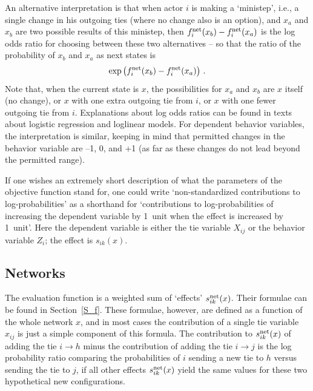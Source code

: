 \documentclass[a4paper,fleqn,11pt]{article}
\newcommand{\+}{\, + \,}
\begin{document}
An alternative interpretation is that when actor $i$ is making
a `ministep', i.e., a single change in his outgoing ties
(where no change also is an option), and
$x_a$ and $x_b$ are two possible results of this ministep,
then $f^{\rm net}_i(x_b) - f^{\rm net}_i(x_a)$ is the log odds ratio
for choosing between these two alternatives -- so that the ratio
of the probability of $x_b$ and $x_a$ as next states is
\[
  \exp\big(f^{\rm net}_i(x_b) - f^{\rm net}_i(x_a)\big) \ .
\]
Note that, when the current state is $x$, the possibilities
for $x_a$ and $x_b$ are $x$ itself (no change), or $x$ with one extra
outgoing tie from $i$, or $x$ with one fewer outgoing tie from $i$.
Explanations about log odds ratios can be found
in texts about logistic regression and loglinear models.
For dependent behavior variables, the interpretation is similar,
keeping in mind that permitted changes in the behavior variable are
--1, 0, and +1 (as far as these changes do not lead beyond the
permitted range).

If one wishes an extremely short description of what the parameters
of the objective function stand for, one could write
`non-standardized contributions to log-probabilities'
as a shorthand for
`contributions to log-probabilities of increasing the
dependent variable by 1~unit when the effect is increased by 1~unit'.
Here the dependent variable is either the tie variable $X_{ij}$
or the behavior variable $Z_i$; the effect is $s_{ik}(x)$.



\subsection{Networks}

The evaluation function is a weighted sum of `effects'
$s^{\rm net}_{ik}(x)$.
Their formulae can be found in Section~\ref{S_f}.
These formulae, however, are defined as a function of the whole
network $x$, and in most cases the contribution of a single tie
variable $x_{ij}$ is just a simple component of this formula.
The contribution to $s^{\rm net}_{ik}(x)$
of adding the tie $i \rightarrow h$ minus the
contribution of adding the tie $i \rightarrow j$ is the log probability ratio
comparing the probabilities of $i$ sending a new tie to $h$ versus
sending the tie to $j$, if all other effects $s^{\rm net}_{ik}(x)$
yield the same values for these two hypothetical new configurations.
\end{document}
